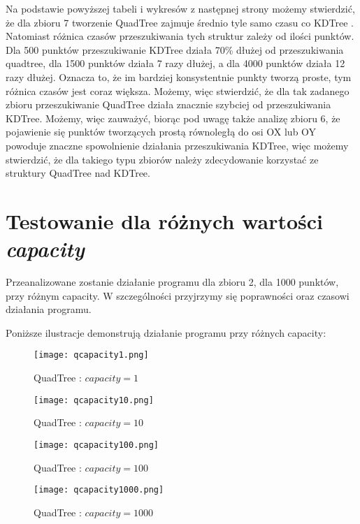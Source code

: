 \documentclass[a4paper, 12pt]{article}
\begin{document}
      \noindent
      \quad Na podstawie powyższej tabeli i wykresów z następnej strony możemy stwierdzić, że dla zbioru 7 tworzenie QuadTree zajmuje średnio tyle samo czasu co KDTree . Natomiast różnica czasów przeszukiwania tych struktur zależy od ilości punktów. Dla 500 punktów przeszukiwanie KDTree działa 70\% dłużej od przeszukiwania quadtree,  dla 1500 punktów działa 7 razy dłużej, a dla 4000 punktów działa 12 razy dłużej. Oznacza to, że im bardziej konsystentnie punkty tworzą proste, tym różnica czasów jest coraz większa. Możemy, więc stwierdzić, że dla tak zadanego zbioru przeszukiwanie QuadTree działa znacznie szybciej od przeszukiwania KDTree. Możemy, więc zauważyć, biorąc pod uwagę także analizę zbioru 6, że pojawienie się punktów tworzących prostą równoległą do osi OX lub OY powoduje znaczne spowolnienie działania przeszukiwania KDTree, więc możemy stwierdzić, że dla takiego typu zbiorów należy zdecydowanie korzystać ze struktury QuadTree nad KDTree.

    \section{Testowanie dla różnych wartości \textit{capacity}}
      \quad Przeanalizowane zostanie działanie programu dla zbioru 2, dla 1000 punktów, przy różnym capacity. W szczególności przyjrzymy się poprawności oraz czasowi działania programu. 

      \noindent
      \quad Poniższe ilustracje demonstrują działanie programu przy różnych capacity:

      \begin{figure}[h!]
      \centering
        \texttt{[image: qcapacity1.png]}
        \caption{QuadTree : $capacity=1$}
      \end{figure}

      \begin{figure}[h!]
      \centering
        \texttt{[image: qcapacity10.png]}
        \caption{QuadTree : $capacity=10$}
      \end{figure}

      \begin{figure}[h!]
      \centering
        \texttt{[image: qcapacity100.png]}
        \caption{QuadTree : $capacity=100$}
      \end{figure}

      \begin{figure}[h!]
      \centering
        \texttt{[image: qcapacity1000.png]}
        \caption{QuadTree : $capacity=1000$}
      \end{figure}
\end{document}
